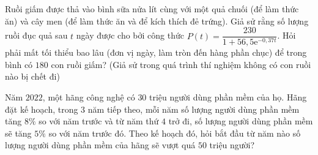 \begin{bt}%

	Ruồi giấm được thả vào bình sữa nửa lít cùng với một quả chuối (để làm thức ăn) và cây men (để làm thức ăn và để kích thích đẻ trứng). Giả sử rằng số lượng ruồi đục quả sau $t$ ngày được cho bởi công thức $P(t)=\dfrac{230}{1+56{,}5\mathrm{e}^{-0{,}37t}}$. Hỏi phải mất tối thiểu bao lâu (đơn vị ngày, làm tròn đến hàng phần chục) để trong bình có $180$ con ruồi giấm? (Giả sử trong quá trình thí nghiệm không có con ruồi nào bị chết đi)
\end{bt}

\begin{bt}%

	Năm $2022$, một hãng công nghệ có $30$ triệu người dùng phần mềm của họ. Hãng đặt kế hoạch, trong $3$ năm tiếp theo, mỗi năm số lượng người dùng phần mềm tăng $8\%$ so với năm trước và từ năm thứ $4$ trở đi, số lượng người dùng phần mềm sẽ tăng $5\%$ so với năm trước đó. Theo kế hoạch đó, hỏi bắt đầu từ năm nào số lượng người dùng phần mềm của hãng sẽ vượt quá $50$ triệu người?
\end{bt}

